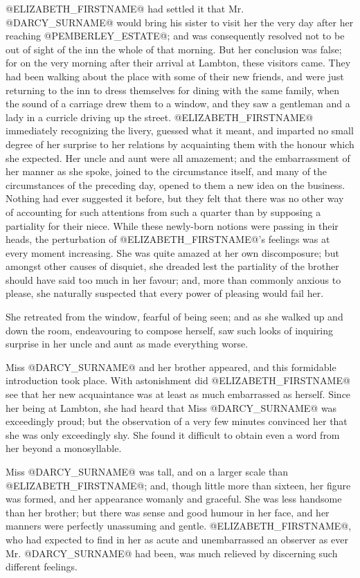 @ELIZABETH_FIRSTNAME@ had settled it that Mr. @DARCY_SURNAME@ would bring his sister to visit
her the very day after her reaching @PEMBERLEY_ESTATE@; and was consequently
resolved not to be out of sight of the inn the whole of that morning.
But her conclusion was false; for on the very morning after their
arrival at Lambton, these visitors came. They had been walking about the
place with some of their new friends, and were just returning to the inn
to dress themselves for dining with the same family, when the sound of a
carriage drew them to a window, and they saw a gentleman and a lady in
a curricle driving up the street. @ELIZABETH_FIRSTNAME@ immediately recognizing
the livery, guessed what it meant, and imparted no small degree of her
surprise to her relations by acquainting them with the honour which she
expected. Her uncle and aunt were all amazement; and the embarrassment
of her manner as she spoke, joined to the circumstance itself, and many
of the circumstances of the preceding day, opened to them a new idea on
the business. Nothing had ever suggested it before, but they felt that
there was no other way of accounting for such attentions from such a
quarter than by supposing a partiality for their niece. While these
newly-born notions were passing in their heads, the perturbation of
@ELIZABETH_FIRSTNAME@'s feelings was at every moment increasing. She was quite
amazed at her own discomposure; but amongst other causes of disquiet,
she dreaded lest the partiality of the brother should have said too much
in her favour; and, more than commonly anxious to please, she naturally
suspected that every power of pleasing would fail her.

She retreated from the window, fearful of being seen; and as she walked
up and down the room, endeavouring to compose herself, saw such looks of
inquiring surprise in her uncle and aunt as made everything worse.

Miss @DARCY_SURNAME@ and her brother appeared, and this formidable introduction
took place. With astonishment did @ELIZABETH_FIRSTNAME@ see that her new
acquaintance was at least as much embarrassed as herself. Since her
being at Lambton, she had heard that Miss @DARCY_SURNAME@ was exceedingly proud;
but the observation of a very few minutes convinced her that she was
only exceedingly shy. She found it difficult to obtain even a word from
her beyond a monosyllable.

Miss @DARCY_SURNAME@ was tall, and on a larger scale than @ELIZABETH_FIRSTNAME@; and, though
little more than sixteen, her figure was formed, and her appearance
womanly and graceful. She was less handsome than her brother; but there
was sense and good humour in her face, and her manners were perfectly
unassuming and gentle. @ELIZABETH_FIRSTNAME@, who had expected to find in her as
acute and unembarrassed an observer as ever Mr. @DARCY_SURNAME@ had been, was much
relieved by discerning such different feelings.

